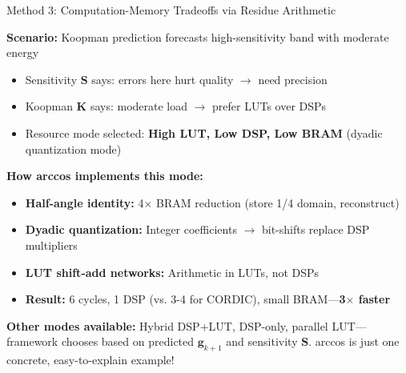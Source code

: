 \documentclass[aspectratio=169,11pt]{beamer}
\begin{document}
\begin{frame}{Method 3: Computation-Memory Tradeoffs via Residue Arithmetic}
\begin{tcolorbox}[colback=orange!10,colframe=orange!70,title=\textbf{Case Study: ONE of $\binom{2N}{N}$ Possible Configurations}]
\vspace{0.15cm}

\textbf{Scenario:} Koopman prediction forecasts high-sensitivity band with moderate energy
\begin{itemize}
    \item Sensitivity $\mathbf{S}$ says: errors here hurt quality $\rightarrow$ need precision
    \item Koopman $\mathbf{K}$ says: moderate load $\rightarrow$ prefer LUTs over DSPs
    \item Resource mode selected: \textbf{High LUT, Low DSP, Low BRAM} (dyadic quantization mode)
\end{itemize}

\textbf{How arccos implements this mode:}
\begin{itemize}
    \item \textbf{Half-angle identity:} 4$\times$ BRAM reduction (store 1/4 domain, reconstruct)
    \item \textbf{Dyadic quantization:} Integer coefficients $\rightarrow$ bit-shifts replace DSP multipliers
    \item \textbf{LUT shift-add networks:} Arithmetic in LUTs, not DSPs
    \item \textbf{Result:} 6 cycles, 1 DSP (vs. 3-4 for CORDIC), small BRAM—\textbf{3$\times$ faster}
\end{itemize}

\textbf{Other modes available:} Hybrid DSP+LUT, DSP-only, parallel LUT—framework chooses based on predicted $\mathbf{g}_{k+1}$ and sensitivity $\mathbf{S}$. arccos is just one concrete, easy-to-explain example!
\end{tcolorbox}

\end{frame}
\end{document}
